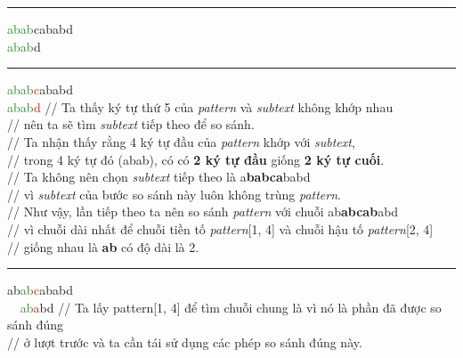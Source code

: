 \documentclass[a4paper,11pt]{article}
\begin{document}
\begin{enumerate}
			\vspace*{2mm}
			\hrule
			\textcolor{ForestGreen}{abab}cababd\\
			\textcolor{ForestGreen}{abab}d

			\vspace*{2mm}
			\hrule
			\textcolor{ForestGreen}{abab}\textcolor{red}{c}ababd\\
			\textcolor{ForestGreen}{abab}\textcolor{red}{d}			\hspace*{1.8cm} // Ta thấy ký tự thứ 5 của \textit{pattern} và \textit{subtext} không khớp nhau\\
																	\hspace*{2.9cm} // nên ta sẽ tìm \textit{subtext} tiếp theo để so sánh. \\
																	\hspace*{2.9cm} // Ta nhận thấy rằng 4 ký tự đầu của \textit{pattern} khớp với \textit{subtext}, \\
																	\hspace*{2.9cm} // trong 4 ký tự đó (abab), có có \textbf{2 ký tự đầu} giống \textbf{2 ký tự cuối}. \\
																	\hspace*{2.9cm} // Ta không nên chọn \textit{subtext} tiếp theo là a\textbf{babca}babd\\
																	\hspace*{2.9cm} // vì \textit{subtext} của bước so sánh này luôn không trùng \textit{pattern}.\\
																	\hspace*{2.9cm} // Như vậy, lần tiếp theo ta nên so sánh \textit{pattern} với chuỗi ab\textbf{abcab}abd\\
																	\hspace*{2.9cm} // vì chuỗi dài nhất để chuỗi tiền tố \textit{pattern}[1, 4] và chuỗi hậu tố \textit{pattern}[2, 4] \\
																	\hspace*{2.9cm} // giống nhau là \textbf{ab} có độ dài là 2.													
			\vspace*{2mm}
			\hrule
			ab\textcolor{ForestGreen}{ab}\textcolor{red}{c}ababd\\
			\textcolor{white}{ab}\textcolor{ForestGreen}{ab}\textcolor{red}{a}bd 			\hspace*{1.4cm} // Ta lấy pattern[1, 4] để tìm chuỗi chung là vì nó là phần đã được so sánh đúng \\
																							\hspace*{2.9cm} // ở lượt trước và ta cần tái sử dụng các phép so sánh đúng này.\\

\end{enumerate}
\end{document}
